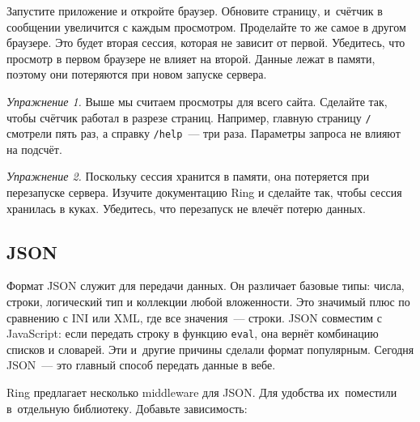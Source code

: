 \else

\begin{english}
\end{english}

\fi

Запустите приложение и откройте браузер. Обновите страницу, и~счётчик в
сообщении увеличится с каждым просмотром. Проделайте то же самое в другом
браузере. Это будет вторая сессия, которая не зависит от первой. Убедитесь, что
просмотр в первом браузере не влияет на второй. Данные лежат в памяти, поэтому
они потеряются при новом запуске сервера.

\emph{Упражнение 1.} Выше мы считаем просмотры для всего сайта. Сделайте так,
чтобы счётчик работал в разрезе страниц. Например, главную страницу \verb|/|
смотрели пять раз, а справку \verb|/help|~--- три раза. Параметры запроса не
влияют на подсчёт.

\emph{Упражнение 2.} Поскольку сессия хранится в памяти, она потеряется при
перезапуске сервера. Изучите документацию Ring и сделайте так, чтобы сессия
хранилась в куках. Убедитесь, что перезапуск не влечёт потерю данных.

\subsection{JSON}


Формат JSON служит для передачи данных. Он различает базовые типы: числа,
строки, логический тип и коллекции любой вложенности. Это значимый плюс по
сравнению с INI или XML, где все значения~--- строки. JSON совместим с JavaScript:
если передать строку в функцию \verb|eval|, она вернёт комбинацию списков
и словарей. Эти и~другие причины сделали формат популярным. Сегодня JSON~--- это
главный способ передать данные в вебе.

Ring предлагает несколько middleware для JSON. Для удобства их~поместили
в~отдельную библиотеку. Добавьте зависимость:

